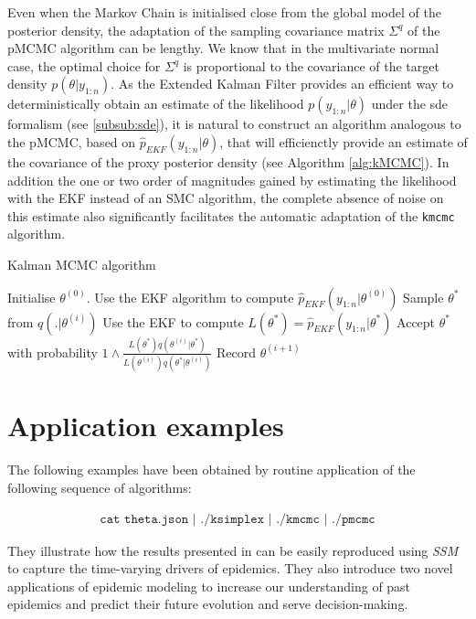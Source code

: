 \documentclass[a4paper,11pt,titlepage]{article}
\theoremstyle{plain} %
\begin{document}
Even when the Markov Chain is initialised close from the global model of the posterior density, the adaptation of the sampling covariance matrix $\Sigma^q$ of the pMCMC algorithm can be lengthy. We know that in the multivariate normal case, the optimal choice for $\Sigma^q$ is proportional to the covariance of the target density $p(\theta|y_{1:n})$. As the Extended Kalman Filter provides an efficient way to deterministically obtain an estimate of the likelihood $p(y_{1:n}|\theta)$ under the sde formalism (see \ref{subsub:sde}), it is natural to construct an algorithm analogous to the pMCMC, based on $\hat{p}_{EKF}(y_{1:n}|\theta)$, that will efficienctly provide an estimate of the covariance of the proxy posterior density (see Algorithm \ref{alg:kMCMC}). In addition the one or two order of magnitudes gained by estimating the likelihood with the EKF instead of an SMC algorithm, the complete absence of noise on this estimate also significantly facilitates the automatic adaptation of the \texttt{kmcmc} algorithm. 


\begin{algorithm}[h]
\caption{Kalman MCMC algorithm}
\label{alg:kMCMC}
{\fontsize{12}{20}\selectfont
\begin{algorithmic}
\STATE Initialise $\theta^{(0)}$.
\STATE Use the EKF algorithm to compute  $\hat{p}_{EKF}(y_{1:n}|\theta^{(0)})$
	\STATE Sample $\theta^{*}$ from $q(.|\theta^{(i)})$
	\STATE Use the EKF to compute $L(\theta^*)=\hat{p}_{EKF}(y_{1:n}|\theta^*)$ 
	\STATE Accept $\theta^{*}$ with probability $1\wedge\frac{L(\theta^{*})q(\theta^{(i)}|\theta^{*})}{L(\theta^{(i)})q(\theta^{*}|\theta^{(i)})}$
	\STATE Record $\theta^{(i+1)}$ 
\ENDFOR
\end{algorithmic}
}
\end{algorithm}

\section{\label{sec:applications}Application examples}

The following examples have been obtained by routine application of the following sequence of algorithms:

\begin{align}
\texttt{cat theta.json | ./ksimplex | ./kmcmc | ./pmcmc}\nonumber
\end{align}

They illustrate how the results presented in \cite{Dureau2013a} can be easily reproduced using \emph{SSM} to capture the time-varying drivers of epidemics. They also introduce two novel applications of epidemic modeling to increase our understanding of past epidemics and predict their future evolution and serve decision-making.
\end{document}
